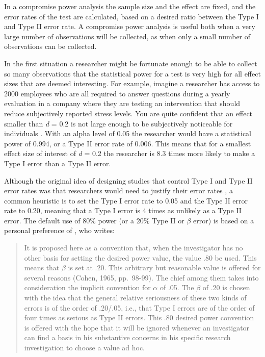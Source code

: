 \documentclass[
  oneside]{book}
\begin{document}
In a compromise power analysis the sample size and the effect are fixed, and the error rates of the test are calculated, based on a desired ratio between the Type I and Type II error rate. A compromise power analysis is useful both when a very large number of observations will be collected, as when only a small number of observations can be collected.

In the first situation a researcher might be fortunate enough to be able to collect so many observations that the statistical power for a test is very high for all effect sizes that are deemed interesting. For example, imagine a researcher has access to 2000 employees who are all required to answer questions during a yearly evaluation in a company where they are testing an intervention that should reduce subjectively reported stress levels. You are quite confident that an effect smaller than \emph{d} = 0.2 is not large enough to be subjectively noticeable for individuals \citep{jaeschke_measurement_1989}. With an alpha level of 0.05 the researcher would have a statistical power of 0.994, or a Type II error rate of 0.006. This means that for a smallest effect size of interest of \emph{d} = 0.2 the researcher is 8.3 times more likely to make a Type I error than a Type II error.

Although the original idea of designing studies that control Type I and Type II error rates was that researchers would need to justify their error rates \citep{neyman_problem_1933}, a common heuristic is to set the Type I error rate to 0.05 and the Type II error rate to 0.20, meaning that a Type I error is 4 times as unlikely as a Type II error. The default use of 80\% power (or a 20\% Type II or \(\beta\) error) is based on a personal preference of \citet{cohen_statistical_1988}, who writes:

\begin{quote}
It is proposed here as a convention that, when the investigator has no other basis for setting the desired power value, the value .80 be used. This means that \(\beta\) is set at .20. This arbitrary but reasonable value is offered for several reasons (Cohen, 1965, pp.~98-99). The chief among them takes into consideration the implicit convention for \(\alpha\) of .05. The \(\beta\) of .20 is chosen with the idea that the general relative seriousness of these two kinds of errors is of the order of .20/.05, i.e., that Type I errors are of the order of four times as serious as Type II errors. This .80 desired power convention is offered with the hope that it will be ignored whenever an investigator can find a basis in his substantive concerns in his specific research investigation to choose a value ad hoc.
\end{quote}
\end{document}

